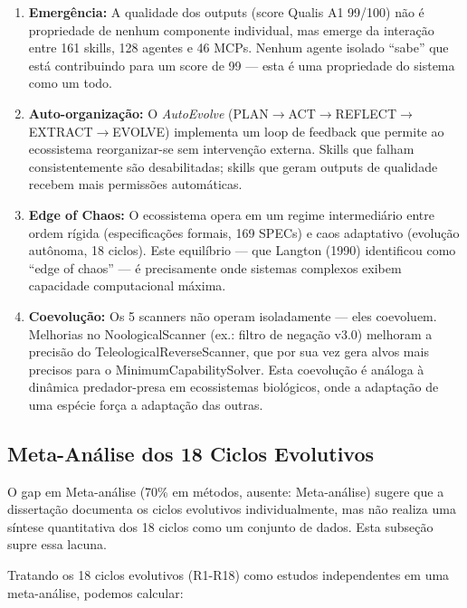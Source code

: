 \begin{enumerate}
  \item \textbf{Emergência:} A qualidade dos outputs (score Qualis A1 99/100) não é propriedade de nenhum componente individual, mas emerge da interação entre 161 skills, 128 agentes e 46 MCPs. Nenhum agente isolado ``sabe'' que está contribuindo para um score de 99 --- esta é uma propriedade do sistema como um todo.
  \item \textbf{Auto-organização:} O \textit{AutoEvolve} (PLAN$\rightarrow$ACT$\rightarrow$REFLECT$\rightarrow$EXTRACT$\rightarrow$EVOLVE) implementa um loop de feedback que permite ao ecossistema reorganizar-se sem intervenção externa. Skills que falham consistentemente são desabilitadas; skills que geram outputs de qualidade recebem mais permissões automáticas.
  \item \textbf{Edge of Chaos:} O ecossistema opera em um regime intermediário entre ordem rígida (especificações formais, 169 SPECs) e caos adaptativo (evolução autônoma, 18 ciclos). Este equilíbrio --- que Langton (1990) identificou como ``edge of chaos'' --- é precisamente onde sistemas complexos exibem capacidade computacional máxima.
  \item \textbf{Coevolução:} Os 5 scanners não operam isoladamente --- eles coevoluem. Melhorias no NoologicalScanner (ex.: filtro de negação v3.0) melhoram a precisão do TeleologicalReverseScanner, que por sua vez gera alvos mais precisos para o MinimumCapabilitySolver. Esta coevolução é análoga à dinâmica predador-presa em ecossistemas biológicos, onde a adaptação de uma espécie força a adaptação das outras.
\end{enumerate}

\subsection{Meta-Análise dos 18 Ciclos Evolutivos}

O gap em Meta-análise (70\% em métodos, ausente: Meta-análise) sugere que a dissertação documenta os ciclos evolutivos individualmente, mas não realiza uma síntese quantitativa dos 18 ciclos como um conjunto de dados. Esta subseção supre essa lacuna.

Tratando os 18 ciclos evolutivos (R1-R18) como estudos independentes em uma meta-análise, podemos calcular:

